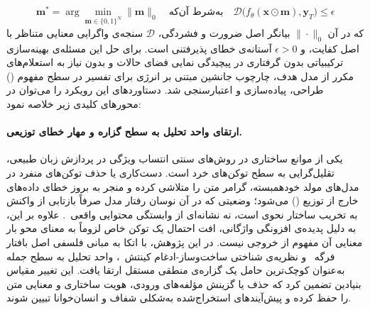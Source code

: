 \begin{equation}\label{eq:chap6_constrained_opt}
    \mathbf{m}^* = \arg\min_{\mathbf{m} \in {\{0, 1\}}^N} \|\mathbf{m}\|_0 \quad \text{به‌شرط آن‌که} \quad \mathcal{D}\big(f_\theta(\mathbf{x} \odot \mathbf{m}), \mathbf{y}_T\big) \le \epsilon
\end{equation}
که در آن $\|\cdot\|_0$ بیانگر اصل ضرورت و فشردگی، $\mathcal{D}$ سنجه‌ی واگرایی معنایی متناظر با اصل کفایت، و $\epsilon > 0$ آستانه‌ی خطای پذیرفتنی است. برای حل این مسئله‌ی بهینه‌سازی ترکیبیاتی بدون گرفتاری در پیچیدگی نمایی فضای حالات و بدون نیاز به استعلام‌های مکرر از مدل هدف، چارچوب جانشین مبتنی بر انرژی برای تفسیر در سطح مفهوم () طراحی، پیاده‌سازی و اعتبارسنجی شد. دستاوردهای این رویکرد را می‌توان در محورهای کلیدی زیر خلاصه نمود:

\paragraph{ارتقای واحد تحلیل به سطح گزاره و مهار خطای توزیعی.}
یکی از موانع ساختاری در روش‌های سنتی انتساب ویژگی در پردازش زبان طبیعی، تقلیل‌گرایی به سطح توکن‌های خرد است. دست‌کاری یا حذف توکن‌های منفرد در مدل‌های مولد خودهمبسته، گرامر متن را متلاشی کرده و منجر به بروز خطای داده‌های خارج از توزیع () می‌شود؛ وضعیتی که در آن نوسان رفتار مدل صرفاً بازتابی از واکنش به تخریب ساختار نحوی است، نه نشانه‌ای از وابستگی محتوایی واقعی~\cite{madsen2022evaluating}. علاوه بر این، به دلیل پدیده‌ی افزونگی واژگانی، افت احتمال یک توکن خاص لزوماً به معنای محو بار معنایی آن مفهوم از خروجی نیست. در این پژوهش، با اتکا به مبانی فلسفی اصل بافتار فرگه~\cite{frege1991foundations} و نظریه‌ی شناختی ساخت‌وساز-ادغام کینتش~\cite{kintsch1998comprehension}، واحد تحلیل به سطح جمله به‌عنوان کوچک‌ترین حامل یک گزاره‌ی منطقی مستقل ارتقا یافت. این تغییر مقیاس بنیادین تضمین کرد که حذف یا گزینش مؤلفه‌های ورودی، هویت ساختاری و معنایی متن را حفظ کرده و پیش‌آیندهای استخراج‌شده به‌شکلی شفاف و انسان‌خوانا تبیین شوند.


